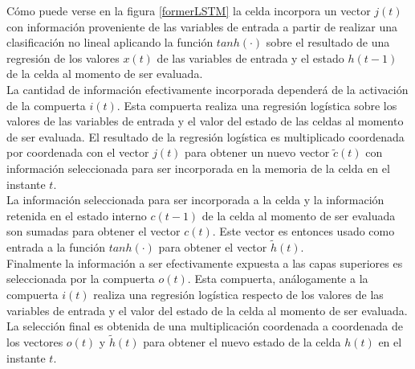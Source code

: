 \documentclass{article}
\begin{document}
	Cómo puede verse en la figura \ref{formerLSTM} la celda incorpora un vector $j(t)$ con información proveniente de las variables de entrada a partir de realizar una clasificación no lineal aplicando la función $tanh(\cdot)$ sobre el resultado de una regresión de los valores $x(t)$ de las variables de entrada y el estado $h(t-1)$ de la celda al momento de ser evaluada.\\
	La cantidad de información efectivamente incorporada dependerá de la activación de la compuerta $i(t)$. Esta compuerta realiza una regresión logística sobre los valores de las variables de entrada y el valor del estado de las celdas al momento de ser evaluada. El resultado de la regresión logística es multiplicado coordenada por coordenada con el vector $j(t)$ para obtener un nuevo vector $\tilde{c}(t)$ con información seleccionada para ser incorporada en la memoria de la celda en el instante $t$.\\
	La información seleccionada para ser incorporada a la celda y la información retenida en el estado interno $c(t-1)$ de la celda al momento de ser evaluada son sumadas para obtener el vector $c(t)$. Este vector es entonces usado como entrada a la función $tanh(\cdot)$ para obtener el vector $\tilde{h}(t)$.\\
	Finalmente la información a ser efectivamente expuesta a las capas superiores es seleccionada por la compuerta $o(t)$. Esta compuerta, análogamente a la compuerta $i(t)$ realiza una regresión logística respecto de los valores de las variables de entrada y el valor del estado de la celda al momento de ser evaluada. La selección final es obtenida de una multiplicación coordenada a coordenada de los vectores $o(t)$ y $\tilde{h}(t)$ para obtener el nuevo estado de la celda $h(t)$ en el instante $t$.\\
	
\end{document}
